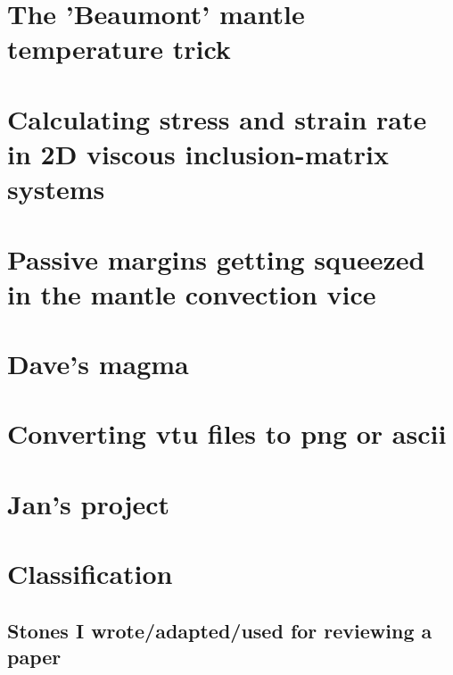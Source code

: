 \documentclass[a4paper,11pt]{report}
\begin{document}
\chapter{The 'Beaumont' mantle temperature trick \label{f141}} %

\chapter{Calculating stress and strain rate in 2D viscous inclusion-matrix systems \label{f142}} %

\chapter{Passive margins getting squeezed in the mantle convection vice \label{f143}} %

\chapter{Dave's magma \label{f144}} %

\chapter{Converting vtu files to png or ascii \label{f145}} %

\chapter{Jan's project \label{f146}} %


\appendix
\chapter{Classification}

\section{
Stones I wrote/adapted/used for reviewing a paper}
\end{document}
